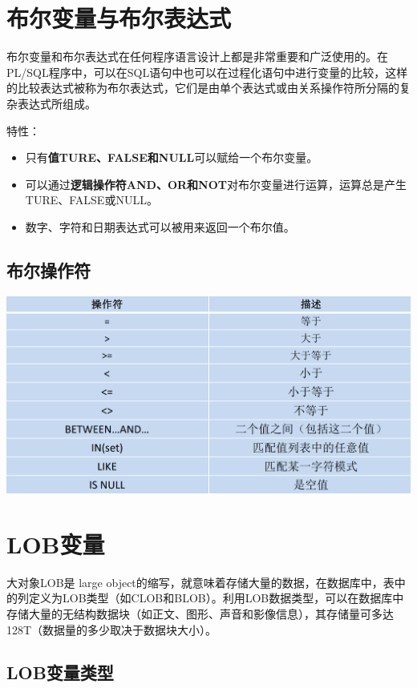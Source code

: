 \documentclass[11pt, a4paper, oneside, UTF8]{ctexbook}
\let\kaishu\relax %
\begin{document}
\section{布尔变量与布尔表达式}
布尔变量和布尔表达式在任何程序语言设计上都是非常重要和广泛使用的。在PL/SQL程序中，可以在SQL语句中也可以在过程化语句中进行变量的比较，这样的比较表达式被称为布尔表达式，它们是由单个表达式或由关系操作符所分隔的复杂表达式所组成。

特性：
\begin{itemize}
  \item 只有{\bfseries\kaishu 值TURE、FALSE和NULL}可以赋给一个布尔变量。
  \item 可以通过{\bfseries\kaishu 逻辑操作符AND、OR和NOT}对布尔变量进行运算，运算总是产生TURE、FALSE或NULL。
  \item 数字、字符和日期表达式可以被用来返回一个布尔值。
\end{itemize}
\subsection{布尔操作符}
\begin{center}
  \begin{minipage}{\textwidth}
    \center
    \includegraphics[width=\textwidth]{picture/布尔操作符.png}
    \captionsetup{hypcap=false}
    \label{fig:布尔操作符}
  \end{minipage}
\end{center}
\section{LOB变量}
大对象LOB是 large object的缩写，就意味着存储大量的数据，在数据库中，表中的列定义为LOB类型（如CLOB和BLOB）。利用LOB数据类型，可以在数据库中存储大量的无结构数据块（如正文、图形、声音和影像信息），其存储量可多达128T（数据量的多少取决于数据块大小）。
\subsection{LOB变量类型}
\end{document}
